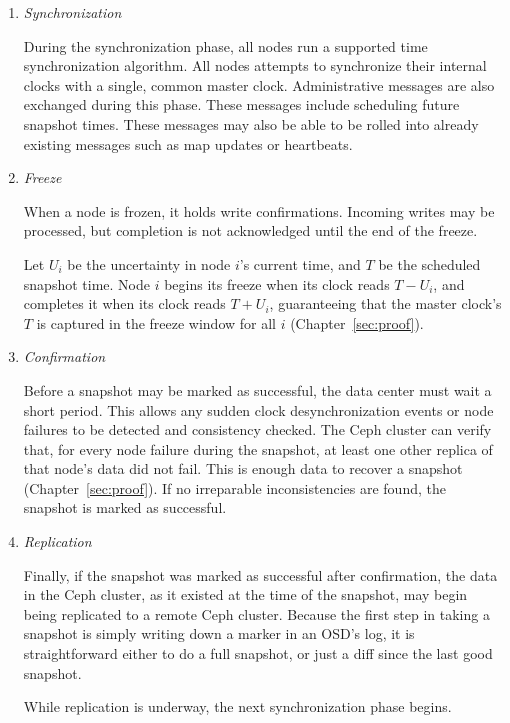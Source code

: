 \begin{enumerate}

\item \emph{Synchronization}

  During the synchronization phase, all nodes run a supported time synchronization
  algorithm. All nodes attempts to synchronize their internal clocks 
  with a single, common master clock. Administrative messages are also 
  exchanged during this phase. These messages include scheduling future 
  snapshot times. These messages may also be able to be rolled into already
  existing messages such as map updates or heartbeats. 

\item \emph{Freeze}
  
  When a node is frozen, it holds write confirmations. Incoming writes may 
  be processed, but
  completion is not acknowledged until the end of the freeze. 
  
  Let $U_i$ be the uncertainty in node
  $i$'s current time, and $T$ be the scheduled snapshot time. Node $i$
  begins its freeze when its clock reads $T - U_i$, and completes it
  when its clock reads $T + U_i$, guaranteeing that the master clock's
  $T$ is captured in the freeze window for all $i$ (Chapter~\ref{sec:proof}).

\item \emph{Confirmation}

  Before a snapshot may be marked as successful, the data center must wait a
  short period. This allows any sudden clock desynchronization events
  or node failures to be detected and consistency
  checked. The Ceph cluster can verify that, for every node failure during
  the snapshot, at
  least one other replica of that node's data did not fail. This is 
  enough data to recover a snapshot (Chapter~\ref{sec:proof}).
  If no irreparable inconsistencies are found, the
  snapshot is marked as successful.

\item \emph{Replication}
  
  Finally, if the snapshot was marked as successful after confirmation, 
  the data in the Ceph cluster, as it existed at the time of the snapshot, 
  may begin being replicated to a remote Ceph cluster. 
  Because the first step in taking a snapshot is
  simply writing down a marker in an OSD's log, it is straightforward
  either to do a full snapshot, or just a diff since the last good
  snapshot.
  
  While replication is underway, the next synchronization phase begins.

\end{enumerate}
